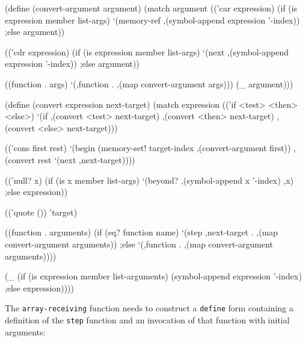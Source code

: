 \begin{Snippet}
      (define (convert-argument argument)
        (match argument
	  (('car expression)
	   (if (is expression member list-args)
	       `(memory-ref ,(symbol-append expression '-index))
           ;else
                argument))
\end{Snippet}
\begin{Snippet}
	  (('cdr expression)
	   (if (is expression member list-args)
	       `(next ,(symbol-append expression '-index))
           ;else
                argument))
\end{Snippet}
\begin{Snippet}
	  ((function . args)
	   `(,function . ,(map convert-argument args)))
	  (_
	   argument)))
\end{Snippet}

\begin{Snippet}
      (define (convert expression next-target)
        (match expression
	  (('if <test> <then> <else>)
	   `(if ,(convert <test> next-target)
	        ,(convert <then> next-target)
	        ,(convert <else> next-target)))
\end{Snippet}
\begin{Snippet}
	  (('cons first rest)
	   `(begin
	      (memory-set! target-index ,(convert-argument first))
	      ,(convert rest `(next ,next-target))))
\end{Snippet}
\begin{Snippet}
	  (('null? x)
	   (if (is x member list-args)
	       `(beyond? ,(symbol-append x '-index) ,x)
           ;else
               expression))
\end{Snippet}
\begin{Snippet}
	  (('quote ())
	   'target)
\end{Snippet}
\begin{Snippet}
	  ((function . arguments)
	   (if (eq? function name)
	      `(step ,next-target
		     . ,(map convert-argument arguments))
           ;else
              `(,function . ,(map convert-argument arguments))))
\end{Snippet}
\begin{Snippet}
          (_
	   (if (is expression member list-arguments)
	       (symbol-append expression '-index)
           ;else
	       expression))))
\end{Snippet}

The \texttt{array-receiving} function needs to construct a \texttt{define}
form containing a definition of the \texttt{step} function and an invocation
of that function with initial arguments:

